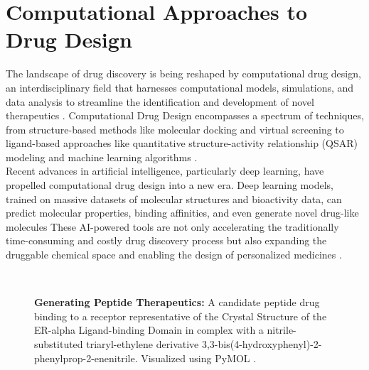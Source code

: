 \section{Computational Approaches to Drug Design} 
The landscape of drug discovery is being reshaped by computational drug design, an interdisciplinary
field that harnesses computational models, simulations, and data analysis to streamline the
identification and development of novel therapeutics \cite{schneider2020rethinking}. Computational
Drug Design encompasses a spectrum of techniques, from structure-based methods like molecular
docking \cite{kitchen2004docking} and virtual screening \cite{shoichet2004virtual} to ligand-based
approaches like quantitative structure-activity relationship (QSAR) modeling
\cite{cherkasov2014qsar} and machine learning algorithms \cite{gawehn2016dl}. \\

Recent advances in artificial intelligence, particularly deep learning, have propelled computational
drug design into a new era. Deep learning models, trained on massive datasets of molecular
structures and bioactivity data, can predict molecular properties, binding affinities, and even
generate novel drug-like molecules \cite{zeng2022deep} These AI-powered tools are not only
accelerating the traditionally time-consuming and costly drug discovery process but also expanding
the druggable chemical space and enabling the design of personalized medicines \cite{gawehn2016dl}.

\begin{figure}
  \center

   \\

  \caption{\textbf{Generating Peptide Therapeutics:} A candidate peptide drug binding to a receptor representative of the Crystal Structure of the ER-alpha Ligand-binding Domain in complex with a nitrile-substituted triaryl-ethylene derivative 3,3-bis(4-hydroxyphenyl)-2-phenylprop-2-enenitrile. Visualized using PyMOL \cite{delano2002pymol}.}

  \label{fig:cover_peptide}
\end{figure}

